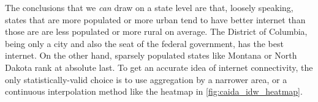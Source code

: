 The conclusions that we \textit{can} draw on a state level are that, loosely speaking, states that are more populated or more urban tend to have better internet than those are are less populated or more rural on average. The District of Columbia, being only a city and also the seat of the \us federal government, has the best internet. On the other hand, sparsely populated states like Montana or North Dakota rank at absolute last. To get an accurate idea of internet connectivity, the only statistically-valid choice is to use aggregation by a narrower area, or a continuous interpolation method like the \idw heatmap in \cref{fig:caida_idw_heatmap}.
